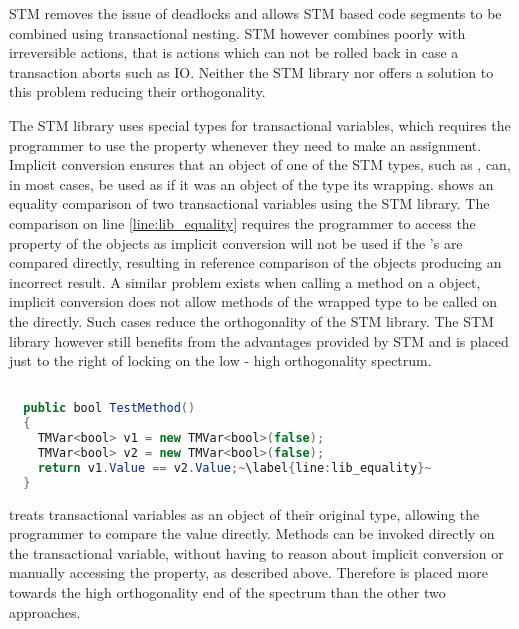 \ac{STM} removes the issue of deadlocks and allows \ac{STM} based code segments to be combined using transactional nesting. \ac{STM} however combines poorly with irreversible actions, that is actions which can not be rolled back in case a transaction aborts such as \ac{IO}. Neither the \ac{STM} library nor \stmnamesp offers a solution to this problem reducing their orthogonality. 

The \ac{STM} library uses special types for transactional variables, which requires the programmer to use the  property whenever they need to make an assignment. Implicit conversion ensures that an object of one of the \ac{STM} types, such as , can, in most cases, be used as if it was an object of the type its wrapping.  shows an equality comparison of two transactional variables using the \ac{STM} library. The comparison on line \ref{line:lib_equality} requires the programmer to access the  property of the  objects as implicit conversion will not be used if the 's are compared directly, resulting in reference comparison of the  objects producing an incorrect result. A similar problem exists when calling a method on a  object, implicit conversion does not allow methods of the wrapped type to be called on the  directly. Such cases reduce the orthogonality of the \ac{STM} library. The \ac{STM} library however still benefits from the advantages provided by \ac{STM} and is placed just to the right of locking on the low - high orthogonality spectrum.

\begin{lstlisting}[label=lst:lib_implicit_conversion,
  caption={Equality comparison of \bscode{TMVar<bool>}},
  language=Java,  
  showspaces=false,
  showtabs=false,
  breaklines=true,
  showstringspaces=false,
  breakatwhitespace=true,
  escapechar=~,
  commentstyle=\color{greencomments},
  keywordstyle=\color{bluekeywords},
  stringstyle=\color{redstrings},
  morekeywords={atomic, retry, orelse, var, get, set, ref, out, bool}]  % Start your code-block

  public bool TestMethod()
  {
    TMVar<bool> v1 = new TMVar<bool>(false);
    TMVar<bool> v2 = new TMVar<bool>(false);
    return v1.Value == v2.Value;~\label{line:lib_equality}~
  }
\end{lstlisting}
\stmnamesp treats transactional variables as an object of their original type, allowing the programmer to compare the value directly. Methods can be invoked directly on the transactional variable, without having to reason about implicit conversion or manually accessing the  property, as described above. Therefore \stmname is placed more towards the high orthogonality end of the spectrum than the other two approaches. 

